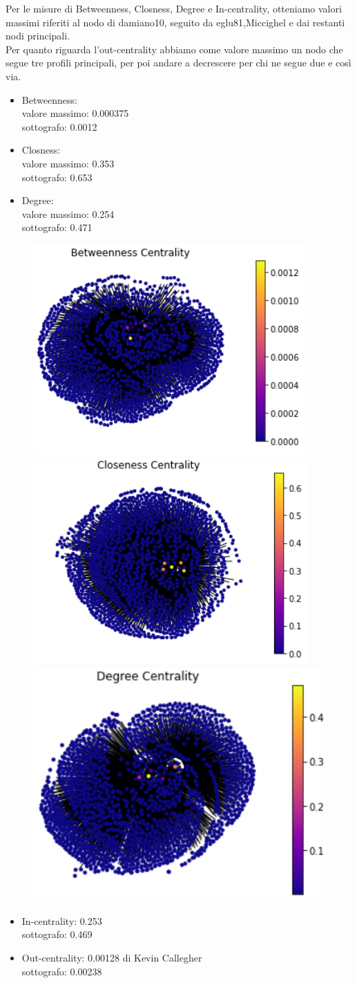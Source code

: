\documentclass[a4paper,11pt]{report}
\begin{document}
Per le misure di Betweenness, Closness, Degree e In-centrality, otteniamo  valori massimi riferiti al nodo di damiano10, seguito da eglu81,Miccighel e dai restanti nodi principali.\\Per quanto riguarda l'out-centrality abbiamo come valore massimo un nodo che segue tre profili principali, per poi andare a decrescere per chi ne segue due e così via.
		\begin{itemize}
			\item Betweenness:\\ valore massimo: 0.000375 \\sottografo: 0.0012 
			\item Closness: \\valore massimo: 0.353 
			\\sottografo: 0.653
			\item Degree: \\valore massimo: 0.254 
			\\sottografo: 0.471
		\end{itemize}
		\begin{figure}[h]
		\includegraphics[width=.32\textwidth]{btw}\hfill
		\includegraphics[width=.32\textwidth]{cls}\hfill
		\includegraphics[width=.32\textwidth]{degree}
		\end{figure}
		\begin{itemize}
			\item In-centrality: 0.253 \\sottografo: 0.469
			\item Out-centrality: 0.00128 di Kevin Callegher \\sottografo: 0.00238 
		\end{itemize}
\end{document}
